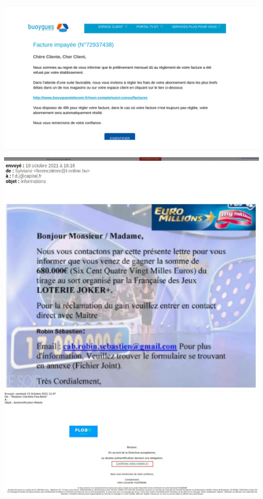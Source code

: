 \documentclass{article}
\begin{document}
\begin{center}
\includegraphics[scale=0.3]{buoygues.png}
\includegraphics[scale=0.3]{loto.png}
\includegraphics[scale=0.3]{float.png}
\end{center}
\end{document}
